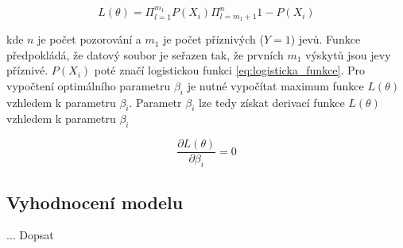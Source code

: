 \begin{equation}
    L(\theta) = \Pi_{l = 1}^{m_1} P(X_i) \Pi_{l = m_1 + 1}^{n} 1 - P(X_i) 
\end{equation}

kde $n$ je počet pozorování a $m_1$ je počet příznivých ($Y = 1$) jevů. Funkce předpokládá, že datový soubor je seřazen tak, že prvních $m_1$ výskytů
jsou jevy příznivé. $P(X_i)$ poté značí logistickou funkci \ref{eq:logisticka_funkce}. Pro vypočtení optimálního parametru $\beta_i$ je nutné vypočítat
maximum funkce $L(\theta)$ vzhledem k parametru $\beta_i$. Parametr $\beta_i$ lze tedy získat derivací funkce $L(\theta)$ vzhledem k parametru $\beta_i$

\begin{equation}
    \frac{\partial L(\theta)}{\partial \beta_i} = 0
\end{equation}

\subsection{Vyhodnocení modelu}
... Dopsat
